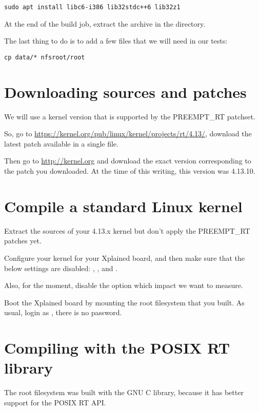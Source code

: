 \begin{verbatim}
sudo apt install libc6-i386 lib32stdc++6 lib32z1
\end{verbatim}

At the end of the build job, extract the
 archive in the 
directory.

The last thing to do is to add a few files that we will need in our
tests:

\begin{verbatim}
cp data/* nfsroot/root
\end{verbatim}

\section{Downloading sources and patches}

We will use a kernel version that is supported by the PREEMPT\_RT
patchset.

So, go to
\url{https://kernel.org/pub/linux/kernel/projects/rt/4.13/},
download the latest patch available in a single file.

Then go to \url{http://kernel.org} and download the exact version
corresponding to the patch you downloaded. At the time of this writing,
this version was 4.13.10.

\section{Compile a standard Linux kernel}

Extract the sources of your 4.13.x kernel but don't apply the
PREEMPT\_RT patches yet.

Configure your kernel for your Xplained board, and then make sure
that the below settings are disabled:
, ,
 and .

Also, for the moment, disable the 
option which impact we want to measure.

Boot the Xplained board by mounting the root filesystem that you
built. As usual, login as , there is no password.

\section{Compiling with the POSIX RT library}

The root filesystem was built with the GNU C library, because it has
better support for the POSIX RT API.

